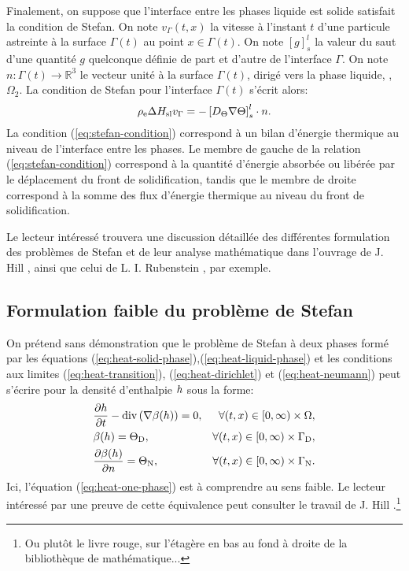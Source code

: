 Finalement, on suppose que l'interface entre les phases liquide est
solide satisfait la condition de Stefan. On note $v_\Gamma(t, x)$ la
vitesse à l'instant $t$ d'une particule astreinte à la surface
$\Gamma(t)$ au point $x \in \Gamma(t)$. On note $[g]_s^l$ la valeur du
saut d'une quantité $g$ quelconque définie de part et
d'autre de l'interface $\Gamma$. On note $n: \Gamma(t)\to \mathbb R^3$
le vecteur unité à la surface $\Gamma(t)$, dirigé vers la phase
liquide, \ie, $\Omega_2$. La condition de Stefan pour l'interface
$\Gamma(t)$ s'écrit alors:
\begin{equation}
  \electrolytedensity \fusionenthalpy v_\Gamma = %
  - \left[\electrolytetdiff\nabla\temperature\right]_s^l\cdot n.%
  \label{eq:stefan-condition}
\end{equation}
La condition (\ref{eq:stefan-condition}) correspond à un bilan
d'énergie thermique au niveau de l'interface entre les phases.  Le
membre de gauche de la relation (\ref{eq:stefan-condition}) correspond
à la quantité d'énergie absorbée ou libérée par le déplacement du front
de solidification, tandis que le membre de droite correspond à la
somme des flux d'énergie thermique au niveau du front de
solidification.

Le lecteur intéressé trouvera une discussion détaillée des
différentes formulation des problèmes de Stefan et de leur analyse
mathématique dans l'ouvrage de J. Hill \cite{HillStefanProblems},
ainsi que celui de L. I. Rubenstein \cite{Rubenstein1971}, par
exemple.

\subsection*{Formulation faible du problème de Stefan}
On prétend sans démonstration que le problème de Stefan à deux
phases formé par les équations
(\ref{eq:heat-solid-phase}),(\ref{eq:heat-liquid-phase}) et les
conditions aux limites (\ref{eq:heat-transition}),
(\ref{eq:heat-dirichlet}) et (\ref{eq:heat-neumann}) peut s'écrire
pour la densité d'enthalpie $h$ sous la forme:
\begin{align}
  & \frac{\partial \enthalpydensity}{\partial t} %
  - \div\parent{ \nabla \beta(\enthalpydensity)} = 0,%
  & \forall (t, x) \in [0,\infty)\times \Omega,\label{eq:heat-one-phase}\\
  &\beta(\enthalpydensity) = \temperature_\mathrm{D}, %
  & \forall (t, x) \in [0,\infty)\times \Gamma_\mathrm{D},\label{eq:heat-one-phase-dirichlet}\\
  &\frac{\partial \beta(\enthalpydensity)}{\partial n} = \temperature_\mathrm{N}, %
  & \forall (t, x) \in [0,\infty)\times \Gamma_\mathrm{N}.\label{eq:heat-one-phase-neumann}
\end{align}
Ici, l'équation (\ref{eq:heat-one-phase}) est à comprendre au sens
faible. Le lecteur intéressé par une preuve de cette équivalence peut
consulter le travail de J. Hill \cite{HillStefanProblems}.\footnote{Ou
plutôt le livre rouge, sur l'étagère en bas au fond à droite de la
bibliothèque de mathématique...}

